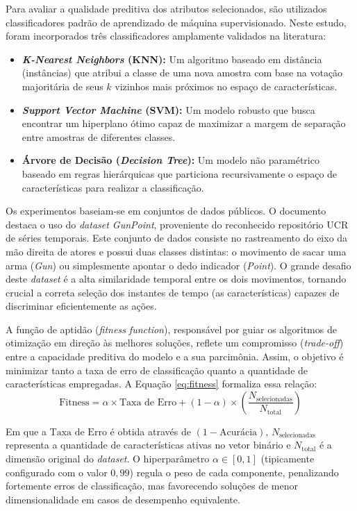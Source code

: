\documentclass[12pt, a4paper, oneside]{report}
\begin{document}
Para avaliar a qualidade preditiva dos atributos selecionados, são utilizados classificadores padrão de aprendizado de máquina supervisionado. Neste estudo, foram incorporados três classificadores amplamente validados na literatura:
\begin{itemize}
    \item \textbf{\textit{K-Nearest Neighbors} (KNN):} Um algoritmo baseado em distância (instâncias) que atribui a classe de uma nova amostra com base na votação majoritária de seus $k$ vizinhos mais próximos no espaço de características.
    \item \textbf{\textit{Support Vector Machine} (SVM):} Um modelo robusto que busca encontrar um hiperplano ótimo capaz de maximizar a margem de separação entre amostras de diferentes classes.
    \item \textbf{Árvore de Decisão (\textit{Decision Tree}):} Um modelo não paramétrico baseado em regras hierárquicas que particiona recursivamente o espaço de características para realizar a classificação.
\end{itemize}

Os experimentos baseiam-se em conjuntos de dados públicos. O documento destaca o uso do \textit{dataset GunPoint}, proveniente do reconhecido repositório UCR de séries temporais. Este conjunto de dados consiste no rastreamento do eixo da mão direita de atores e possui duas classes distintas: o movimento de sacar uma arma (\textit{Gun}) ou simplesmente apontar o dedo indicador (\textit{Point}). O grande desafio deste \textit{dataset} é a alta similaridade temporal entre os dois movimentos, tornando crucial a correta seleção dos instantes de tempo (as características) capazes de discriminar eficientemente as ações.

A função de aptidão (\textit{fitness function}), responsável por guiar os algoritmos de otimização em direção às melhores soluções, reflete um compromisso (\textit{trade-off}) entre a capacidade preditiva do modelo e a sua parcimônia. Assim, o objetivo é minimizar tanto a taxa de erro de classificação quanto a quantidade de características empregadas. A Equação \ref{eq:fitness} formaliza essa relação:
\begin{equation} \label{eq:fitness}
    \text{Fitness} = \alpha \times \text{Taxa de Erro} + (1 - \alpha) \times \left( \frac{N_{\text{selecionadas}}}{N_{\text{total}}} \right)
\end{equation}

Em que a $\text{Taxa de Erro}$ é obtida através de $(1 - \text{Acurácia})$, $N_{\text{selecionadas}}$ representa a quantidade de características ativas no vetor binário e $N_{\text{total}}$ é a dimensão original do \textit{dataset}. O hiperparâmetro $\alpha \in [0, 1]$ (tipicamente configurado com o valor $0,99$) regula o peso de cada componente, penalizando fortemente erros de classificação, mas favorecendo soluções de menor dimensionalidade em casos de desempenho equivalente.
\end{document}
